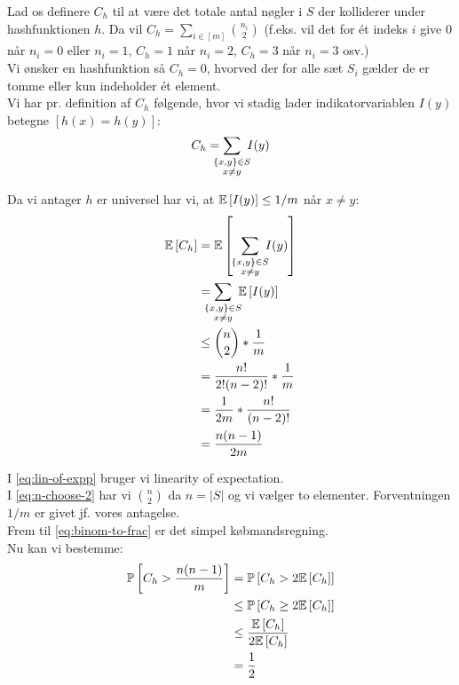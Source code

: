 Lad os definere $C_h$ til at være det totale antal nøgler i $S$ der kolliderer under hashfunktionen $h$. Da vil $C_h = \sum_{i \in [m]} \binom{n_i}{2}$ (f.eks. vil det for ét indeks $i$ give $0$ når $n_i = 0$ eller $n_i = 1$, $C_h = 1$ når $n_i = 2$, $C_h = 3$ når $n_i = 3$ osv.)\\


Vi ønsker en hashfunktion så $C_h = 0$, hvorved der for alle sæt $S_i$ gælder de er tomme eller kun indeholder ét element.\\

Vi har pr. definition af $C_h$ følgende, hvor vi stadig lader indikatorvariablen $I(y)$ betegne $[h(x) = h(y)]$:
\begin{align}
  C_h = \sum_{\mathclap{\substack{ \{x, y\} \in S\\ x \neq y}}} \ I(y)
\end{align}

Da vi antager $h$ er universel har vi, at $\mathbb{E} \left[  I(y)  \right] \leq 1/m$ når $x \neq y$:
\begin{align}
  \E{C_h}
  &= \E{ \ \ \sum_{\mathclap{\substack{ \{x, y\} \in S\\ x \neq y}}} \ I(y)} \nonumber \\
  &= \sum_{\mathclap{\substack{ \{x, y\} \in S\\ x \neq y}}} \ \E{I(y)} \label{eq:lin-of-expp} \\
  &\leq \binom{n}{2} * \frac{1}{m} \label{eq:n-choose-2} \\
  &= \frac{n!}{2!(n-2)!} * \frac{1}{m} \nonumber \\
  &= \frac{1}{2m} * \frac{n!}{(n-2)!} \nonumber \\
  &= \frac{n(n-1)}{2m} \label{eq:binom-to-frac}
\end{align}

I \cref{eq:lin-of-expp} bruger vi linearity of expectation.\\
I \cref{eq:n-choose-2} har vi $\binom{n}{2}$ da $n = |S|$ og vi vælger to elementer. Forventningen $1/m$ er givet jf. vores antagelse.\\
Frem til \cref{eq:binom-to-frac} er det simpel købmandsregning.\\


Nu kan vi bestemme:
\begin{align}
  \mathbb{P} \left[  C_h > \frac{n(n-1)}{m}  \right]
  &= \mathbb{P} \left[  C_h > 2 \mathbb{E} \left[  C_h  \right]  \right] \nonumber \\
  &\leq \mathbb{P} \left[  C_h \geq 2 \mathbb{E} \left[  C_h  \right]  \right] \nonumber \\
  &\leq \frac{\mathbb{E} \left[  C_h  \right]}{2 \mathbb{E} \left[  C_h  \right]} \label{eq:benyt-markov} \\
  &= \frac{1}{2} \nonumber
\end{align}

